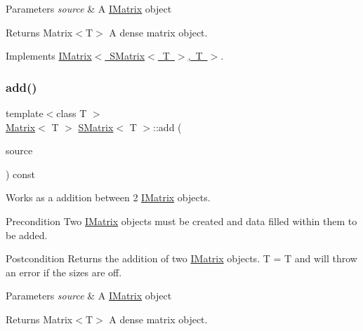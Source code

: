 \begin{DoxyParams}{Parameters}
{\em source} & A \mbox{\hyperlink{class_i_matrix}{I\+Matrix}} object \\
\hline
\end{DoxyParams}
\begin{DoxyReturn}{Returns}
Matrix$<$\+T$>$ A dense matrix object. 
\end{DoxyReturn}


Implements \mbox{\hyperlink{class_i_matrix_a661dc43bb607b98c28414cdd49bc64f7}{I\+Matrix$<$ S\+Matrix$<$ T $>$, T $>$}}.

\mbox{\label{class_s_matrix_aacb1dc2203941a7cd5dfffc299672c7a}} 
\subsubsection{\texorpdfstring{add()}{add()}\hspace{0.1cm}{\footnotesize\ttfamily [6/6]}}
{\footnotesize\ttfamily template$<$class T $>$ \\
\mbox{\hyperlink{class_matrix}{Matrix}}$<$ T $>$ \mbox{\hyperlink{class_s_matrix}{S\+Matrix}}$<$ T $>$\+::add (\begin{DoxyParamCaption}\item[{const \mbox{\hyperlink{class_i_matrix}{I\+Matrix}}$<$ \mbox{\hyperlink{class_d_matrix}{D\+Matrix}}$<$ T $>$, T $>$ \&}]{source }\end{DoxyParamCaption}) const}



Works as a addition between 2 \mbox{\hyperlink{class_i_matrix}{I\+Matrix}} objects. 

\begin{DoxyPrecond}{Precondition}
Two \mbox{\hyperlink{class_i_matrix}{I\+Matrix}} objects must be created and data filled within them to be added. 
\end{DoxyPrecond}
\begin{DoxyPostcond}{Postcondition}
Returns the addition of two \mbox{\hyperlink{class_i_matrix}{I\+Matrix}} objects. T = T and will throw an error if the sizes are off.
\end{DoxyPostcond}

\begin{DoxyParams}{Parameters}
{\em source} & A \mbox{\hyperlink{class_i_matrix}{I\+Matrix}} object \\
\hline
\end{DoxyParams}
\begin{DoxyReturn}{Returns}
Matrix$<$\+T$>$ A dense matrix object. 
\end{DoxyReturn}
\mbox{\label{class_s_matrix_a0576b4cae95310f2acb9c3f5118c31ce}} 
